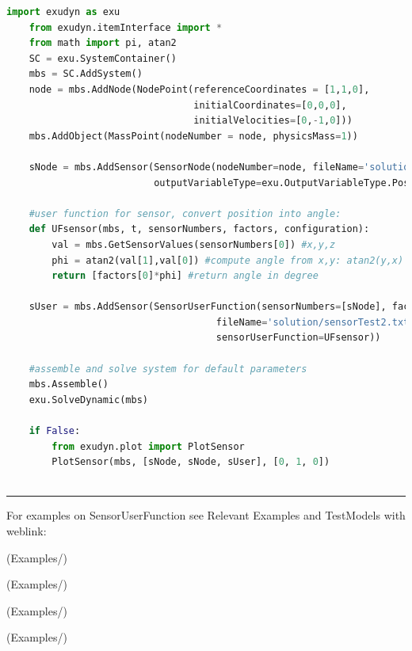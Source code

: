    \begin{lstlisting}[language=Python]
    import exudyn as exu
    from exudyn.itemInterface import *
    from math import pi, atan2
    SC = exu.SystemContainer()
    mbs = SC.AddSystem()
    node = mbs.AddNode(NodePoint(referenceCoordinates = [1,1,0], 
                                 initialCoordinates=[0,0,0],
                                 initialVelocities=[0,-1,0]))
    mbs.AddObject(MassPoint(nodeNumber = node, physicsMass=1))
    
    sNode = mbs.AddSensor(SensorNode(nodeNumber=node, fileName='solution/sensorTest.txt',
                          outputVariableType=exu.OutputVariableType.Position))

    #user function for sensor, convert position into angle:
    def UFsensor(mbs, t, sensorNumbers, factors, configuration):
        val = mbs.GetSensorValues(sensorNumbers[0]) #x,y,z
        phi = atan2(val[1],val[0]) #compute angle from x,y: atan2(y,x)
        return [factors[0]*phi] #return angle in degree
    
    sUser = mbs.AddSensor(SensorUserFunction(sensorNumbers=[sNode], factors=[180/pi], 
                                     fileName='solution/sensorTest2.txt',
                                     sensorUserFunction=UFsensor))

    #assemble and solve system for default parameters
    mbs.Assemble()
    exu.SolveDynamic(mbs)

    if False:
        from exudyn.plot import PlotSensor
        PlotSensor(mbs, [sNode, sNode, sUser], [0, 1, 0])
    
    \end{lstlisting}
\vspace{6pt}\par\noindent\rule{\textwidth}{0.4pt}
%
\noindent For examples on SensorUserFunction see Relevant Examples and TestModels with weblink:
\bi
\item {} (Examples/)
\item {} (Examples/)
\item {} (Examples/)
\item {} (Examples/)
